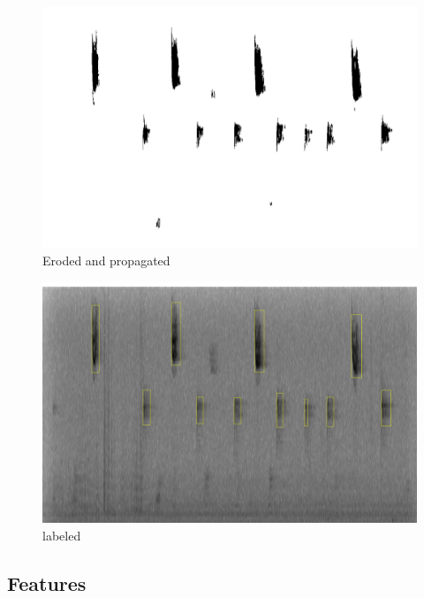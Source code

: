 \documentclass{article} %
\begin{document}
\begin{figure}[p]
    \centering
    \includegraphics[width=0.8\linewidth, height=0.3\linewidth]{../Figure/Eroded_and_propagated}
     \centering
    \caption{Eroded and propagated}
    \label{fig:Eroded}
\end{figure}

\begin{figure}[p]
    \centering
    \includegraphics[width=0.8\linewidth, height=0.3\linewidth]{../Figure/labeled}
     \centering
    \caption{labeled}
    \label{fig:labeled}
\end{figure}

\subsection{Features}
\label{sec:Features}


\end{document}
